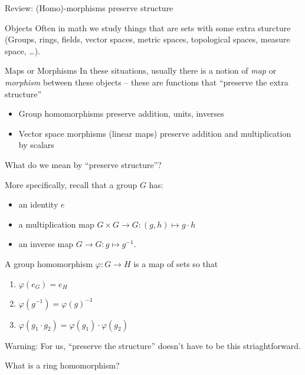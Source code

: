 \documentclass{beamer}
\begin{document}
\begin{frame}{Review: (Homo)-morphisms preserve structure}
\begin{block}{Objects}  Often in math we study things that are sets with some extra sturcture (Groups, rings, fields, vector spaces, metric spaces, topological spaces, measure space, \dots).
\end{block}
\begin{block}{Maps or Morphisms}  In these situations, usually there is a notion of \emph{map} or \emph{morphism} between these objects -- these are functions that ``preserve the extra structure''
\end{block}
  \begin{itemize}
  \item Group homomorphisms preserve addition, units, inverses
    \item Vector space morphisms (linear maps) preserve addition and multiplication by scalars
\end{itemize}

\end{frame}

\begin{frame}{What do we mean by ``preserve structure''?}

  More specifically, recall that a group $G$ has:
  \begin{itemize}
  \item an identity $e$
  \item a multiplication map $G\times G\to G: (g,h)\mapsto g\cdot h$
    \item an inverse map $G\to G:g\mapsto g^{-1}$.
  \end{itemize}
  
  \begin{definition}
    A group homomorphism $\varphi:G\to H$ is a map of sets so that
    \begin{enumerate}
    \item $\varphi(e_G)=e_H$
    \item $\varphi(g^{-1})=\varphi(g)^{-1}$
      \item $\varphi(g_1\cdot g_2)=\varphi(g_1)\cdot \varphi(g_2)$
      \end{enumerate}
\end{definition}

\alert{Warning:} For us, ``preserve the structure'' doesn't have to be this striaghtforward.
\end{frame}


\begin{frame}[plain,c]

\begin{center}

\Huge

What is a ring homomorphism?
\end{center}

\end{frame}
\end{document}
